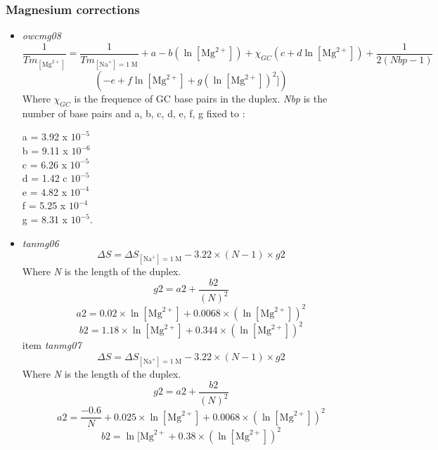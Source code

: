 \documentclass{article}
\begin{document}
\subsubsection{Magnesium corrections}
  \begin{itemize}
  \item \textit{owcmg08}
 \begin{displaymath}
 \frac{1}{Tm_{[\mbox{Mg}^{2+}]}} = \frac{1}{Tm_{[\mbox{Na}^+]=1\;\mathrm{M}}} + a
 - b (\ln [\mbox{Mg}^{2+}]) + \chi_{GC} (c + d \ln [\mbox{Mg}^{2+}]) + \frac{1}{2 (Nbp-1)} 
 \end{displaymath}
 \begin{displaymath}
 (-e + f \ln [\mbox{Mg}^{2+}] + g (\ln [\mbox{Mg}^{2+}])^{2}])
 \end{displaymath}
 Where \emph{$\chi_{GC}$} is the frequence of GC base pairs in the duplex.
 \emph{Nbp} is the number of base pairs
 and a, b, c, d, e, f, g fixed to :
 
 a = 3.92 x $10^{-5}$ \\
 b = 9.11 x $10^{-6}$ \\
 c = 6.26 x $10^{-5}$ \\
 d = 1.42 c $10^{-5}$ \\
 e = 4.82 x $10^{-4}$ \\
 f = 5.25 x $10^{-4}$ \\
 g = 8.31 x $10^{-5}$. \\
 \item \textit{tanmg06}
 \begin{displaymath}
  \Delta{}S=\Delta{}S_{[\mbox{Na}^+]=1\;\mathrm{M}}- 3.22 \times (N - 1) \times g2  
 \end{displaymath}
 Where \emph{N} is the length of the duplex.
 \begin{displaymath}
  g2=a2 + \frac{b2}{(N)^2}  
 \end{displaymath}
 \begin{displaymath}
  a2= 0.02 \times \ln [\mbox{Mg}^{2+}] + 0.0068 \times (\ln [\mbox{Mg}^{2+}])^2  
 \end{displaymath}
 \begin{displaymath}
  b2= 1.18 \times \ln [\mbox{Mg}^{2+}] + 0.344 \times (\ln [\mbox{Mg}^{2+}])^2
 \end{displaymath}
 item \textit{tanmg07}
 \begin{displaymath}
  \Delta{}S=\Delta{}S_{[\mbox{Na}^+]=1\;\mathrm{M}}- 3.22 \times (N - 1) \times g2  
 \end{displaymath}
 Where \emph{N} is the length of the duplex.
 \begin{displaymath}
  g2=a2 + \frac{b2}{(N)^2}  
 \end{displaymath}
 \begin{displaymath}
  a2= \frac{-0.6}{N} + 0.025 \times \ln [\mbox{Mg}^{2+}] + 0.0068 \times (\ln [\mbox{Mg}^{2+}])^2  
 \end{displaymath}
 \begin{displaymath}
  b2= \ln [\mbox{Mg}^{2+} + 0.38 \times (\ln [\mbox{Mg}^{2+}])^2  
 \end{displaymath}
 \end{itemize} 
\end{document}
